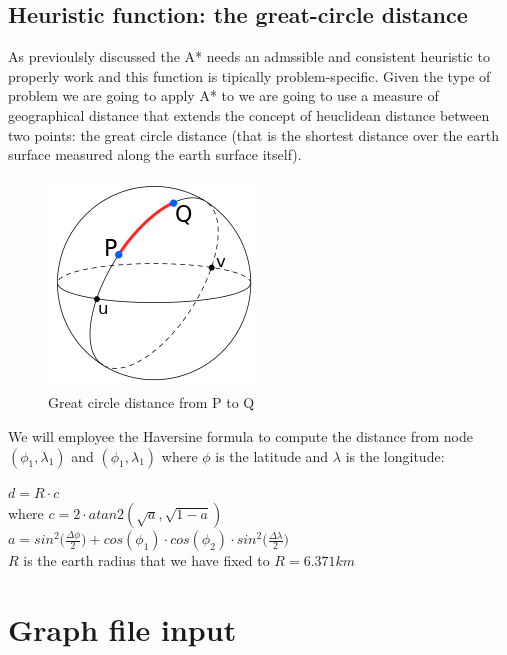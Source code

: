 \documentclass[twocolumn, switch]{article} %
\begin{document}
\subsection{Heuristic function: the great-circle distance}
As previoulsly discussed the A* needs an admssible and consistent heuristic to properly work and this
function is tipically problem-specific. Given the type of problem we are going to apply A* to we are going
to use a measure of geographical distance that extends the concept of heuclidean distance between two points:
the great circle distance (that is the shortest distance over the earth surface measured along the
earth surface itself).
\begin{figure}[ht!]
  \centering
  \includegraphics[width=0.5\linewidth]{haversine.png}
  \caption{Great circle distance from P to Q}
  \label{haversine}
\end{figure}
We will employee the Haversine formula to compute the distance from node $(\phi_1,\lambda_1)$
and $(\phi_1,\lambda_1)$ where $\phi$ is the latitude and $\lambda$ is the longitude:
\begin{center}
  $d = R \cdot c$\\
  where $c = 2 \cdot atan2(\sqrt{a},\sqrt{1-a})$\\
  $a = sin^2\Big({\frac{\Delta \phi}{2}}\Big) + cos(\phi_1) \cdot cos(\phi_2) \cdot sin^2\Big({\frac{\Delta \lambda}{2}}\Big)$
  \\$R$ is the earth radius that we have fixed to $R=6.371km$
\end{center}

\section{Graph file input}
\end{document}
